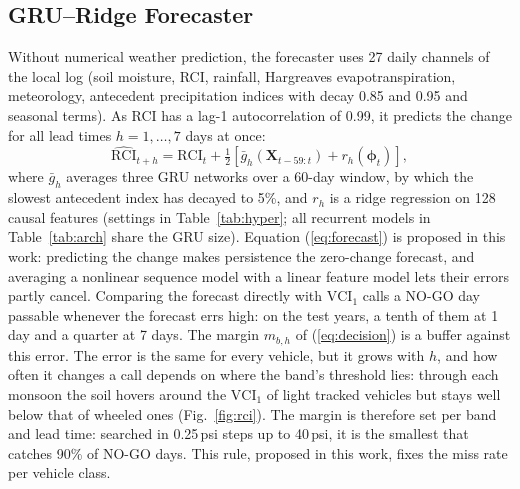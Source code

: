 \documentclass[conference]{IEEEtran}
\begin{document}
\subsection{GRU--Ridge Forecaster}
Without numerical weather prediction, the forecaster uses 27 daily channels of the local log
(soil moisture, RCI, rainfall, Hargreaves evapotranspiration, meteorology,
antecedent precipitation indices with decay 0.85 and 0.95 and seasonal terms).
As RCI has a lag-1 autocorrelation of 0.99, it predicts the change for
all lead times $h = 1, \dots, 7$ days at once:
\begin{equation}
  \widehat{\mathrm{RCI}}_{t+h} = \mathrm{RCI}_t
  + \tfrac{1}{2}\left[\bar g_h(\mathbf{X}_{t-59:t}) + r_h(\boldsymbol{\phi}_t)\right],
  \label{eq:forecast}
\end{equation}
where $\bar g_h$ averages three GRU networks over a 60-day window, by which the slowest
antecedent index has decayed to 5\%, and $r_h$ is a ridge regression on 128 causal features
(settings in Table~\ref{tab:hyper}; all recurrent models in Table~\ref{tab:arch} share the GRU
size). Equation (\ref{eq:forecast}) is
proposed in this work: predicting the change makes persistence the zero-change forecast, and averaging a
nonlinear sequence model with a linear feature model lets their errors partly cancel. Comparing
the forecast directly with $\mathrm{VCI}_1$ calls a NO-GO day passable whenever the forecast errs
high: on the test years, a tenth of them at 1 day and a quarter at 7 days. The margin $m_{b,h}$ of
(\ref{eq:decision}) is a buffer against this error. The error is the same for every vehicle, but
it grows with $h$, and how often it changes a call depends on where the band's threshold lies:
through each monsoon the soil hovers around the $\mathrm{VCI}_1$ of
light tracked vehicles but stays well below that of wheeled ones (Fig.~\ref{fig:rci}). The margin
is therefore set per band and lead time: searched in 0.25\,psi steps up to 40\,psi, it is the
smallest that catches 90\% of NO-GO days. This rule, proposed in this work, fixes the miss rate per vehicle
class.
\end{document}
